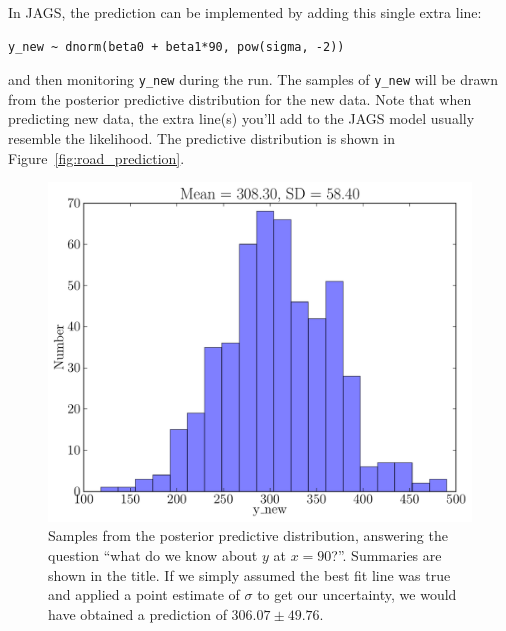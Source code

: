 In JAGS, the prediction can be implemented by adding this single extra line:
\begin{framed}
\begin{verbatim}
y_new ~ dnorm(beta0 + beta1*90, pow(sigma, -2))
\end{verbatim}
\end{framed}
and then monitoring {\tt y\_new} during the run. The samples of {\tt y\_new}
will be drawn from the posterior predictive distribution for the new data.
Note that when predicting new data, the extra line(s) you'll add to the JAGS
model usually resemble the likelihood. The predictive distribution is shown in
Figure~\ref{fig:road_prediction}.
\begin{figure}[ht!]
\begin{center}
\includegraphics[scale=0.5]{Figures/road_prediction.pdf}
\caption{Samples from the posterior predictive distribution, answering the
question ``what do we know about $y$ at $x=90$?''. Summaries are shown in
the title. If we simply assumed the best fit line was true and applied a
point estimate of $\sigma$ to get our uncertainty, we would have obtained a
prediction of $306.07 \pm 49.76$.}
\end{center}
\end{figure}

